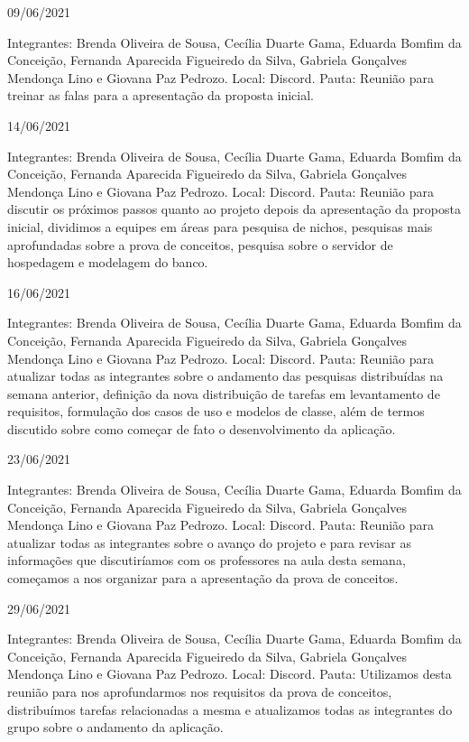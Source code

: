 \begin{apendicesenv}
\begin{flushleft}
09/06/2021 

Integrantes: Brenda Oliveira de Sousa, Cecília Duarte Gama, Eduarda Bomfim da Conceição, Fernanda Aparecida Figueiredo da Silva, Gabriela Gonçalves Mendonça Lino e Giovana Paz Pedrozo.
\newline
Local: \gls{Discord}.
\newline
Pauta:  Reunião para treinar as falas para a apresentação da proposta inicial.

14/06/2021 

Integrantes: Brenda Oliveira de Sousa, Cecília Duarte Gama, Eduarda Bomfim da Conceição, Fernanda Aparecida Figueiredo da Silva, Gabriela Gonçalves Mendonça Lino e Giovana Paz Pedrozo.
\newline
Local: \gls{Discord}.
\newline
Pauta: Reunião para discutir os próximos passos quanto ao projeto depois da apresentação da proposta inicial, dividimos a equipes em áreas para pesquisa de nichos, pesquisas mais aprofundadas sobre a prova de conceitos, pesquisa sobre o servidor de hospedagem e modelagem do banco.

16/06/2021

Integrantes: Brenda Oliveira de Sousa, Cecília Duarte Gama, Eduarda Bomfim da Conceição, Fernanda Aparecida Figueiredo da Silva, Gabriela Gonçalves Mendonça Lino e Giovana Paz Pedrozo.
\newline
Local: \gls{Discord}.
\newline
Pauta: Reunião para atualizar todas as integrantes sobre o andamento das pesquisas distribuídas na semana anterior, definição da nova distribuição de tarefas em levantamento de requisitos, formulação dos casos de uso e modelos de classe, além de termos discutido sobre como começar de fato o desenvolvimento da aplicação.

23/06/2021 

Integrantes: Brenda Oliveira de Sousa, Cecília Duarte Gama, Eduarda Bomfim da Conceição, Fernanda Aparecida Figueiredo da Silva, Gabriela Gonçalves Mendonça Lino e Giovana Paz Pedrozo.
\newline
Local: \gls{Discord}.
\newline
Pauta: Reunião para atualizar todas as integrantes sobre o avanço do projeto e para revisar as informações que discutiríamos com os professores na aula desta semana, começamos a nos organizar para a apresentação da prova de conceitos.

29/06/2021 

Integrantes: Brenda Oliveira de Sousa, Cecília Duarte Gama, Eduarda Bomfim da Conceição, Fernanda Aparecida Figueiredo da Silva, Gabriela Gonçalves Mendonça Lino e Giovana Paz Pedrozo.
\newline
Local: \gls{Discord}.
\newline
Pauta: Utilizamos desta reunião para nos aprofundarmos nos requisitos da prova de conceitos, distribuímos tarefas relacionadas a mesma e atualizamos todas as integrantes do grupo sobre o andamento da aplicação.


\end{flushleft}
\end{apendicesenv}

